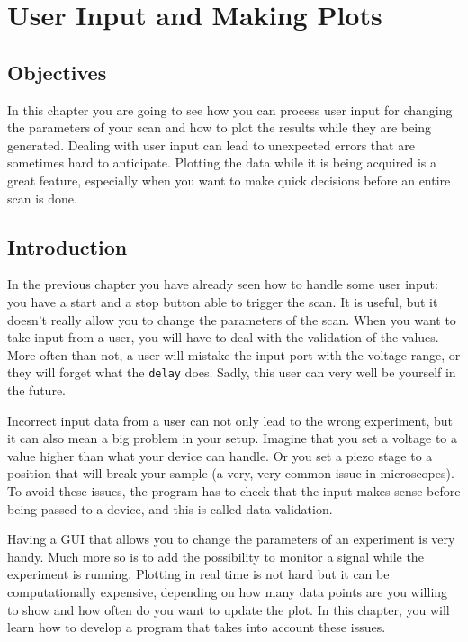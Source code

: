 \chapter{User Input and Making Plots}\label{user-input-and-makingplots}

\section{Objectives}
In this chapter you are going to see how you can process user input for
changing the parameters of your scan and how to plot the results while
they are being generated. Dealing with user input can lead to unexpected
errors that are sometimes hard to anticipate. Plotting the data while it
is being acquired is a great feature, especially when you want to make
quick decisions before an entire scan is done.

\section{Introduction}
In the previous chapter you have already seen how to handle some user
input: you have a start and a stop button able to trigger the scan. It
is useful, but it doesn't really allow you to change the parameters of
the scan. When you want to take input from a user, you will have to deal
with the validation of the values. More often than not, a user will
mistake the input port with the voltage range, or they will forget what
the \texttt{delay} does. Sadly, this user can very well be yourself in
the future.

Incorrect input data from a user can not only lead to the wrong
experiment, but it can also mean a big problem in your setup. Imagine that
you set a voltage to a value higher than what your device can handle. Or
you set a piezo stage to a position that will break your sample (a very,
very common issue in microscopes). To avoid these issues, the program
has to check that the input makes sense before being passed to a device,
and this is called data validation.

Having a {GUI} that allows you to change the parameters of an experiment
is very handy. Much more so is to add the possibility to monitor a
signal while the experiment is running. Plotting in real time is not
hard but it can be computationally expensive, depending on how many data
points are you willing to show and how often do you want to update the
plot. In this chapter, you will learn how to develop a program that
takes into account these issues.

